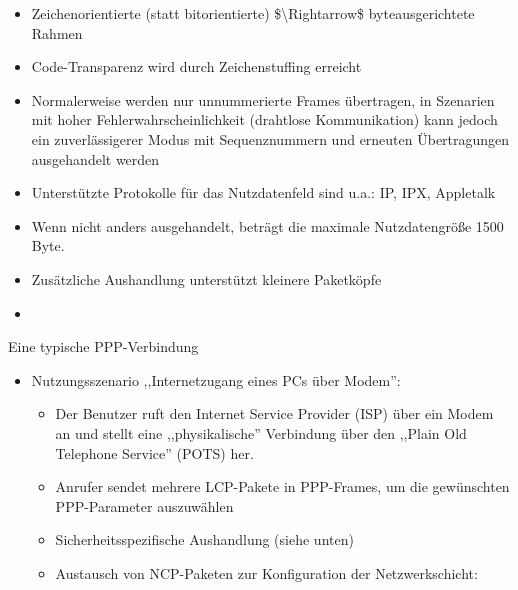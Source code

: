 \documentclass[a4paper]{article}
\begin{document}
\begin{multicols}{3}
    \begin{itemize}
        \item
              Zeichenorientierte (statt bitorientierte)
              \$\textbackslash Rightarrow\$ byteausgerichtete Rahmen
        \item
              Code-Transparenz wird durch Zeichenstuffing erreicht
        \item
              Normalerweise werden nur unnummerierte Frames übertragen, in Szenarien
              mit hoher Fehlerwahrscheinlichkeit (drahtlose Kommunikation) kann
              jedoch ein zuverlässigerer Modus mit Sequenznummern und erneuten
              Übertragungen ausgehandelt werden
        \item
              Unterstützte Protokolle für das Nutzdatenfeld sind u.a.: IP, IPX,
              Appletalk
        \item
              Wenn nicht anders ausgehandelt, beträgt die maximale Nutzdatengröße
              1500 Byte.
        \item
              Zusätzliche Aushandlung unterstützt kleinere Paketköpfe
        \item
    \end{itemize}

    Eine typische PPP-Verbindung

    \begin{itemize}
        \item
              Nutzungsszenario ,,Internetzugang eines PCs über Modem'':

              \begin{itemize}
                  \item
                        Der Benutzer ruft den Internet Service Provider (ISP) über ein Modem
                        an und stellt eine ,,physikalische'' Verbindung über den ,,Plain Old
                        Telephone Service'' (POTS) her.
                  \item
                        Anrufer sendet mehrere LCP-Pakete in PPP-Frames, um die gewünschten
                        PPP-Parameter auszuwählen
                  \item
                        Sicherheitsspezifische Aushandlung (siehe unten)
                  \item
                        Austausch von NCP-Paketen zur Konfiguration der Netzwerkschicht:


\end{itemize}
\end{itemize}
\end{multicols}
\end{document}
